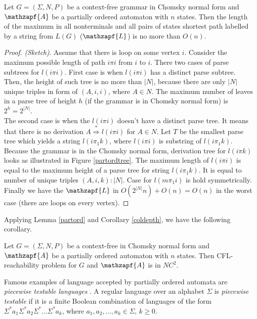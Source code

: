\begin{lemma}
\label{partord}
Let  $G = (\Sigma, N, P)$ be a context-free grammar in Chomsky normal form and $\mathzapf{A}$ be a partially ordered automaton with $n$ states. Then the length of the maximum in all nonterminals and all pairs of states shortest path labelled by a string from $L(G)$ ($\mathzapf{L}$) is no more than $O(n)$.
\end{lemma}
\begin{proof} \textit{(Sketch)}.
Assume that there is loop on some vertex $i$. Consider the maximum possible length of path $i\pi i$ from $i$ to $i$. There two cases of parse subtrees for $l(i\pi i)$. First case is when $l(i\pi i)$ has a distinct parse subtree. Then, the height of such tree is no more than $|N|$, because there are only $|N|$ unique triples in form of $(A, i, i)$, where $A \in N$. The maximum number of leaves in a parse tree of height $h$ (if the grammar is in Chomsky normal form) is $2^h=2^{|N|}$.
\\The second case is when the $l(i\pi i)$ doesn't have a distinct parse tree. It means that there is no derivation $A \stackrel {*}{\Rightarrow } l(i\pi i)$ for $A \in N$. Let $T$ be the smallest parse tree which yields a string $l(i \pi_1 k)$, where $l(i\pi i)$ is substring of $l(i \pi_1 k)$. Because the grammar is in the Chomsky normal form, derivation tree for $l(i \pi k)$ looks as illustrated in Figure \ref{partordtree}. The maximum length of $l(i\pi i)$ is equal to the maximum height of a parse tree for string $l(i \pi_1 k)$. It is equal to number of unique triples $(A, i, k):|N|$. Case for $l(m \pi_1 i)$ is hold symmetrically. Finally we have the $\mathzapf{L}$ in $O(2^{|N|}n) + O(n) = O(n)$ in the worst case (there are loops on every vertex).
\end{proof}


Applying Lemma \ref{partord} and Corollary \ref{coldepth}, we have the following corollary.
\begin{corollary} 
Let  $G = (\Sigma, N, P)$ be a context-free in Chomsky normal form and $\mathzapf{A}$ be a partially ordered automaton with $n$ states. Then CFL-reachability problem for $G$ and $\mathzapf{A}$ is in $NC^2$.
\end{corollary}



Famous examples of language accepted by partially ordered automata are \textit{piecewise testable languages} \cite*{simon1972hierarchies, masopust2019partially}. A regular language over an alphabet $\Sigma$ is \textit{piecewise testable} if it is a finite Boolean combination of languages of the form $\Sigma^*a_1\Sigma^*a_2\Sigma^* ... \Sigma^*a_k$, where $a_1, a_2, ... , a_k \in \Sigma$, $k \ge 0$. 